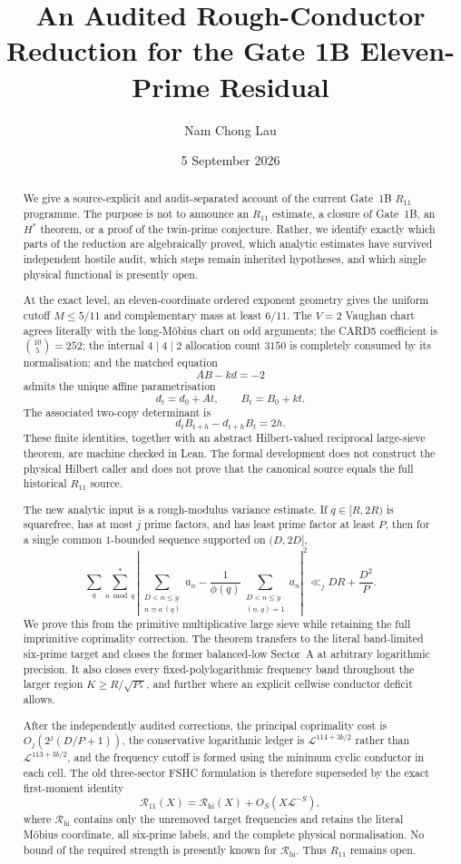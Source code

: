 \documentclass[11pt,reqno]{amsart}
\title[The Gate 1B $R_{11}$ frontier]{An Audited Rough-Conductor Reduction for the Gate 1B Eleven-Prime Residual}
\author{Nam Chong Lau}
\date{5 September 2026}
\numberwithin{equation}{section}
\theoremstyle{definition}
\theoremstyle{remark}
\newcommand{\1}{\mathbf 1}
\newcommand{\LL}{\mathcal L}
\newcommand{\RR}{\mathcal R}
\newcommand{\Rhi}{\RR_{\mathrm{hi}}}
\newcommand{\Roneone}{\RR_{11}}
\begin{document}
\begin{abstract}
We give a source-explicit and audit-separated account of the current Gate~1B
$R_{11}$ programme.  The purpose is not to announce an $R_{11}$ estimate, a
closure of Gate~1B, an $H^*$ theorem, or a proof of the twin-prime conjecture.
Rather, we identify exactly which parts of the reduction are algebraically
proved, which analytic estimates have survived independent hostile audit, which
steps remain inherited hypotheses, and which single physical functional is
presently open.

At the exact level, an eleven-coordinate ordered exponent geometry gives the
uniform cutoff $M\le 5/11$ and complementary mass at least $6/11$.  The
$V=2$ Vaughan chart agrees literally with the long-M\"obius chart on odd
arguments; the CARD5 coefficient is $\binom{10}{5}=252$; the internal
$4\mid4\mid2$ allocation count $3150$ is completely consumed by its
normalisation; and the matched equation
\[
        AB-kd=-2
\]
admits the unique affine parametrisation
\[
        d_t=d_0+At,\qquad B_t=B_0+kt.
\]
The associated two-copy determinant is
\[
        d_tB_{t+h}-d_{t+h}B_t=2h.
\]
These finite identities, together with an abstract Hilbert-valued reciprocal
large-sieve theorem, are machine checked in Lean.  The formal development does
not construct the physical Hilbert caller and does not prove that the canonical
source equals the full historical $R_{11}$ source.

The new analytic input is a rough-modulus variance estimate.  If
$q\in[R,2R)$ is squarefree, has at most $j$ prime factors, and has least prime
factor at least $P$, then for a single common $1$-bounded sequence supported on
$(D,2D]$,
\[
 \sum_q\sum_{a\bmod q}^{*}\left|
 \sum_{\substack{D<n\le y\\n\equiv a\, (q)}}a_n
 -\frac1{\phi(q)}\sum_{\substack{D<n\le y\\(n,q)=1}}a_n
 \right|^2
 \ll_j DR+\frac{D^2}{P}.
\]
We prove this from the primitive multiplicative large sieve while retaining the
full imprimitive coprimality correction.  The theorem transfers to the literal
band-limited six-prime target and closes the former balanced-low Sector~A at
arbitrary logarithmic precision.  It also closes every fixed-polylogarithmic
frequency band throughout the larger region $K\ge R/\sqrt{P_*}$, and further
where an explicit cellwise conductor deficit allows.

After the independently audited corrections, the principal coprimality cost is
$O_j(2^j(D/P+1))$, the conservative logarithmic ledger is
$\LL^{114+3b/2}$ rather than $\LL^{113+3b/2}$, and the frequency cutoff is
formed using the minimum cyclic conductor in each cell.  The old three-sector
FSHC formulation is therefore superseded by the exact first-moment identity
\[
        \Roneone(X)=\Rhi(X)+O_S(X\LL^{-S}),
\]
where $\Rhi$ contains only the unremoved target frequencies and retains the
literal M\"obius coordinate, all six-prime labels, and the complete physical
normalisation.  No bound of the required strength is presently known for
$\Rhi$.  Thus $R_{11}$ remains open.
\end{abstract}
\end{document}
